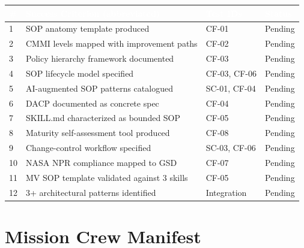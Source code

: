 \documentclass[11pt,letterpaper]{article}
\newcommand{\tableheader}[1]{\textbf{\sffamily\textcolor{white}{#1}}}
\begin{document}
\begin{center}
\begin{tabularx}{\textwidth}{L{0.5cm}L{5.5cm}L{2.5cm}L{2cm}}
\toprule
{}
\tableheader{\#} & \tableheader{Success Criterion (abbreviated)} & \tableheader{Test IDs} & \tableheader{Status} \\
 & SOP anatomy template produced & CF-01 & Pending \\
2 & CMMI levels mapped with improvement paths & CF-02 & Pending \\
3 & Policy hierarchy framework documented & CF-03 & Pending \\
4 & SOP lifecycle model specified & CF-03, CF-06 & Pending \\
5 & AI-augmented SOP patterns catalogued & SC-01, CF-04 & Pending \\
6 & DACP documented as concrete spec & CF-04 & Pending \\
7 & SKILL.md characterized as bounded SOP & CF-05 & Pending \\
8 & Maturity self-assessment tool produced & CF-08 & Pending \\
9 & Change-control workflow specified & SC-03, CF-06 & Pending \\
10 & NASA NPR compliance mapped to GSD & CF-07 & Pending \\
11 & MV SOP template validated against 3 skills & CF-05 & Pending \\
12 & 3+ architectural patterns identified & Integration & Pending \\
\bottomrule
\end{tabularx}
\end{center}

\section{Mission Crew Manifest}
\end{document}
